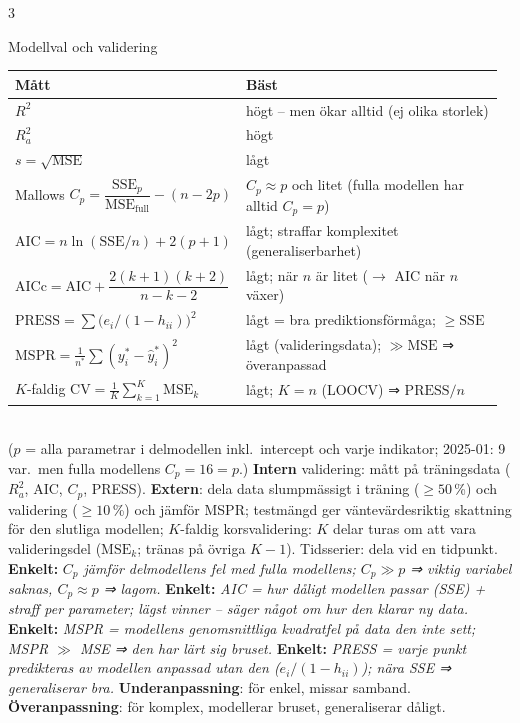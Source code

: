 \documentclass[8pt]{extarticle}
\makeatletter
\newcounter{sect}
\newcommand{\sect}[3][hd]{\par\vspace{1.5pt}\refstepcounter{sect}\noindent
  {\setlength{\fboxsep}{1.8pt}\colorbox{#1}{\parbox{\dimexpr\linewidth-2\fboxsep}{\color{white}\sffamily\bfseries
  \strut\thesect\enspace #2}}}\label{#3}\par\nobreak\vspace{0.8pt}\@afterheading}
\newcommand{\enk}[1]{{\color{cEnk}\sffamily\bfseries Enkelt:} {\itshape #1}}
\newcommand{\SSE}{\mathrm{SSE}}
\newcommand{\MSE}{\mathrm{MSE}}
\makeatother
\begin{document}
\begin{multicols*}{3}
\sect[cBygg]{Modellval och validering}{sec:val}
{\small
\begin{tabular}{@{}>{\raggedright\arraybackslash}p{0.42\linewidth}>{\raggedright\arraybackslash}p{0.55\linewidth}@{}}
Mått & Bäst\\\hline
$R^2$ & högt – men ökar alltid (ej olika storlek)\\
$R^2_a$ & högt\\
$s=\sqrt{\MSE}$ & lågt\\
Mallows $C_p=\dfrac{\SSE_p}{\MSE_{\text{full}}}-(n-2p)$ & $C_p\approx p$ och litet (fulla modellen har alltid $C_p=p$)\\
$\mathrm{AIC}=n\ln(\SSE/n)+2(p+1)$ & lågt; straffar komplexitet (generaliserbarhet)\\
$\mathrm{AICc}=\mathrm{AIC}+\dfrac{2(k+1)(k+2)}{n-k-2}$ & lågt; när $n$ är litet ($\to$ AIC när $n$ växer)\\
$\mathrm{PRESS}=\sum\bigl(e_i/(1-h_{ii})\bigr)^2$ & lågt = bra prediktionsförmåga; $\ge\SSE$\\
$\mathrm{MSPR}=\frac1{n^*}\sum(y^*_i-\hat y^*_i)^2$ & lågt (valideringsdata); $\gg\MSE$ ⇒ överanpassad\\
$K$-faldig $\mathrm{CV}=\frac1K\sum_{k=1}^{K}\MSE_k$ & lågt; $K=n$ (LOOCV) ⇒ $\mathrm{PRESS}/n$
\end{tabular}}\\[1pt]
($p$ = alla parametrar i delmodellen inkl.\ intercept och varje indikator; 2025-01: 9 var.\ men fulla modellens $C_p=16=p$.) \textbf{Intern} validering: mått på träningsdata ($R^2_a$, AIC, $C_p$, PRESS). \textbf{Extern}: dela data slumpmässigt i träning ($\ge50$\,\%) och validering ($\ge10$\,\%) och jämför MSPR; testmängd ger väntevärdesriktig skattning för den slutliga modellen; $K$-faldig korsvalidering: $K$ delar turas om att vara valideringsdel ($\MSE_k$; tränas på övriga $K-1$). Tidsserier: dela vid en tidpunkt. \enk{$C_p$ jämför delmodellens fel med fulla modellens; $C_p\gg p$ ⇒ viktig variabel saknas, $C_p\approx p$ ⇒ lagom.} \enk{AIC = hur dåligt modellen passar (SSE) + straff per parameter; lägst vinner – säger något om hur den klarar ny data.} \enk{MSPR = modellens genomsnittliga kvadratfel på data den inte sett; MSPR $\gg$ MSE ⇒ den har lärt sig bruset.} \enk{PRESS = varje punkt predikteras av modellen anpassad \emph{utan} den ($e_i/(1-h_{ii})$); nära SSE ⇒ generaliserar bra.}
\textbf{Underanpassning}: för enkel, missar samband. \textbf{Överanpassning}: för komplex, modellerar bruset, generaliserar dåligt.

\end{multicols*}
\end{document}
